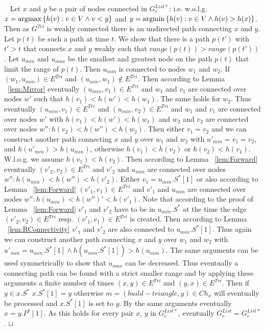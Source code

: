 \documentclass[11pt]{article}
\newcommand{\sq}{\hbox{\rlap{$\sqcap$}$\sqcup$}}
\newcommand{\qed}{\hspace*{\fill}\sq}
\newenvironment{proof}{\noindent {\bf Proof.}\ }{\qed\par\vskip 4mm\par}
\def\argmin{{\rm argmin}}
\def\argmax{{\rm argmax}}
\begin{document}
\begin{proof}
Let $x$ and $y$ be a pair of nodes connected in $G^{List*}_e$; i.e. w.o.l.g. $x=\argmax \left\{h(v) : v \in V \wedge v<y\right\}$ and $y=\argmin \left\{h(v) : v \in V \wedge h(v)>h(x) \right\}$. Then as $G^{Tri}$ is weakly connected there is an undirected path connecting $x$ and $y$. Let $p(t)$ be such a path at time $t$. We show that there is a path $p(t')$ with $t'>t$ that connects $x$ and $y$ weakly such that $range(p(t))>range(p(t'))$. Let $u_{min}$ and $u_{max}$ be the smallest and greatest node on the path $p(t)$ that limit the range of $p(t)$. Then $u_{min}$ is connected to nodes $w_1$ and $w_2$. If $(w_1,u_{min})\in E^{Tri}$ and $(u_{min},w_1)\notin E^{Tri}$. Then according to Lemma ~\ref{lem:Mirror} eventually $(u_{min},v_1)\in E^{Tri}$ and $w_1$ and $v_1$ are connected over nodes $w'$ such that $h(v_1)<h(w')<h(w_1)$. The same holds for $w_2$. Thus eventually $(u_{min},v_1)\in E^{Tri}$ and $(u_{min},v_2)\in E^{Tri}$ and $w_1$ and $v_1$ are connected over nodes $w'$ with $h(v_1)<h(w')<h(w_1)$ and $w_2$ and $v_2$ are connected over nodes $w'': h(v_2)<h(w'')<h(w_2)$. Then either $v_1=v_2$ and we can construct another path connecting $x$ and $y$ over $w_1$ and $w_2$ with $u'_{min}=v_1=v_2$, and $h(u'_{min})>h(u_{min})$, otherwise $h(v_1)<h(v_2)$ or $h(v_2)<h(v_1)$. W.l.o.g. we assume $h(v_1)<h(v_2)$. Then according to Lemma ~\ref{lem:Forward} eventually $(v'_2,v_2)\in E^{Tri}$ and $v'_2$ and $u_{min}$ are connected over nodes $w'' : h(u_{min})<h(w'')<h(v'_2)$. Either $v_1=u_{min}.S^*[1]$ or also according to Lemma ~\ref{lem:Forward}  $(v'_1,v_1)\in E^{Tri}$ and $v'_1$ and $u_{min}$ are connected over nodes $w'': h(u_{min})<h(w'')'<h(v'_1)$. Note that according to the proof of Lemma ~\ref{lem:Forward} $v'_1$ and $v'_2$ have to be in $u_{min}.S^*$ at the time the edge $(v'_2,v_2)\in E^{Tri}$ resp. $(v'_1,v_1)\in E^{Tri}$ is created. Then according to Lemma ~\ref{lem:RConnectivity} $v'_1$ and  $v'_2$ are also connected to $u_{min}.S^*[1]$. Thus again we can construct another path connecting $x$ and $y$ over $w_1$ and $w_2$ with $u'_{min}=u_{min}.S^*[1]\wedge h(u_{min}.S^*[1])>h(u_{min})$. The same arguments can be used symmetrically to show that $u_{max}$ can be decreased. Thus eventually a connecting path can be found with a strict smaller range and by applying these arguments a finite number of times $(x,y)\in E^{Tri}$ and $(y,x) \in E^{Tri}$. Then if $y \in x.S^*$ $x.S^*[1]=y$ otherwise $m=(build-triangle,y) \in Ch_x$ will eventually be processed and $x.S^*[1]$ is set to $y$. By the same arguments eventually $x=y.P^*[1]$. As this holds for every pair $x$, $y$ in $G^{List*}_e$, eventually $G^{List}_e=G^{List*}_e$.
\end{proof}
\end{document}
